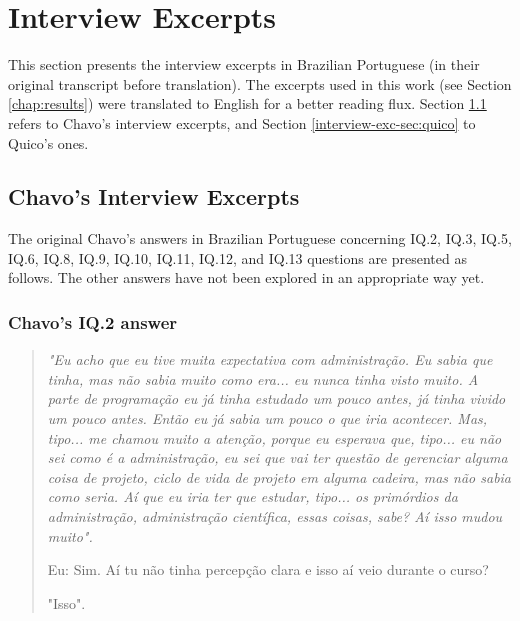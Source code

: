 \chapter{Interview Excerpts}
\label{chap:interview-excerpts}

This section presents the interview excerpts in Brazilian Portuguese (in their original transcript before translation). The excerpts used in this work (see Section \ref{chap:results}) were translated to English for a better reading flux. Section \ref{interview-exc-sec:chavo} refers to Chavo’s interview excerpts, and Section \ref{interview-exc-sec:quico} to Quico’s ones. 

\section{Chavo’s Interview Excerpts}
\label{interview-exc-sec:chavo}

The original Chavo's answers in Brazilian Portuguese concerning 
\gls{IQ}.2, 
\gls{IQ}.3, 
\gls{IQ}.5, 
\gls{IQ}.6, 
\gls{IQ}.8, 
\gls{IQ}.9, 
\gls{IQ}.10, 
\gls{IQ}.11,   
\gls{IQ}.12, and 
\gls{IQ}.13
questions are presented as follows. The other answers have not been explored in an appropriate way yet.


\subsection{Chavo’s IQ.2 answer}
\label{interview-exc-ss:chavo-iq2}

\begin{quote}
    \itshape
    "Eu acho que eu tive muita expectativa com administração. Eu sabia que tinha, mas não sabia muito como era... eu nunca tinha visto muito. A parte de programação eu já tinha estudado um pouco antes, já tinha vivido um pouco antes. Então eu já sabia um pouco o que iria acontecer. Mas, tipo... me chamou muito a atenção, porque eu esperava que, tipo... eu não sei como é a administração, eu sei que vai ter questão de gerenciar alguma coisa de projeto, ciclo de vida de projeto em alguma cadeira, mas não sabia como seria. Aí que eu iria ter que estudar, tipo... os primórdios da administração, administração científica, essas coisas, sabe? Aí isso mudou muito".

    \colorbox{black!15}{Eu: Sim. Aí tu não tinha percepção clara e isso aí veio durante o curso?}

    "Isso". 
\end{quote}

